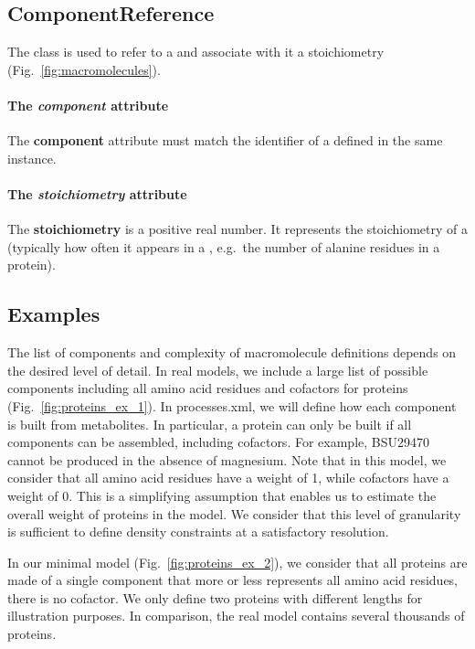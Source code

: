 \subsection{ComponentReference}
\label{sec:component_reference}

The \componentreference{} class is used to refer to a \component{}
and associate with it a stoichiometry (Fig.~\ref{fig:macromolecules}).

\paragraph{The \textit{component} attribute}
The \textbf{component} attribute must match the identifier of a \component{}
defined in the same \rbamacromolecules{} instance.

\paragraph{The \textit{stoichiometry} attribute}
The \textbf{stoichiometry} is a positive real number.
It represents the stoichiometry of a \component{}
(typically how often it appears in a \macromolecule,
e.g.\ the number of alanine residues in a protein).

\subsection{Examples}

The list of components and complexity of macromolecule definitions depends on
the desired level of detail.
In real models, we include a large list of possible components including all
amino acid residues and cofactors for proteins (Fig.~\ref{fig:proteins_ex_1}).
In processes.xml, we will define how each component is built from metabolites.
In particular, a protein can only be built if all components can be assembled,
including cofactors.
For example, BSU29470 cannot be produced in the absence of magnesium.
Note that in this model, we consider that all amino acid residues have a weight
of 1, while cofactors have a weight of 0.
This is a simplifying assumption that enables us to estimate the overall weight
of proteins in the model.
We consider that this level of granularity is sufficient to define density
constraints at a satisfactory resolution.

In our minimal model (Fig.~\ref{fig:proteins_ex_2}),
we consider that all proteins are made of a single component that more or less
represents all amino acid residues, there is no cofactor.
We only define two proteins with different lengths for illustration purposes.
In comparison, the real model contains several thousands of proteins.

